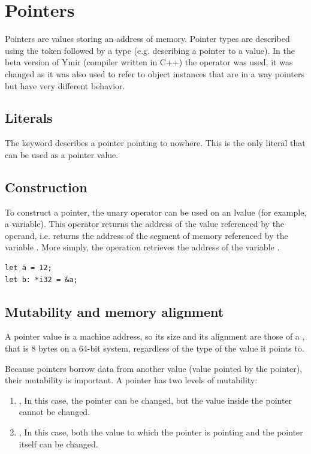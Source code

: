 \section{Pointers}%
\label{sec:compound:pointer_type}

Pointers are values storing an address of memory. Pointer types are described
using the \token{*} token followed by a type (e.g.  describing a
pointer to a  value). In the beta version of Ymir (compiler written
in C++) the operator \token{\&} was used, it was changed as it was also used to
refer to object instances that are in a way pointers but have very different
behavior.

\subsection{Literals}

The keyword  describes a pointer pointing to nowhere.
This is the only literal that can be used as a pointer value.

\subsection{Construction}

To construct a pointer, the unary operator \token{\&} can be used on an lvalue
(for example, a variable). This operator returns the address of the value
referenced by the operand, i.e.  returns the address of the segment
of memory referenced by the variable . More simply, the operation
retrieves the address of the variable .

\begin{lstlisting}[style=coloredverbatim]
let a = 12;
let b: *i32 = &a;
\end{lstlisting}

\subsection{Mutability and memory alignment}

A pointer value is a machine address, so its size and its alignment are those of
a , that is 8 bytes on a 64-bit system, regardless of the type of
the value it points to.
\smallskip

Because pointers borrow data from another value (value pointed by the pointer),
their mutability is important. A pointer has two levels of mutability:
\begin{enumerate}
  \setlength\itemsep{-4pt}
\item {}, In this case, the pointer can be changed, but the value
  inside the pointer cannot be changed.
\item {}, In this case, both the value to which the pointer
  is pointing and the pointer itself can be changed.
\end{enumerate}


